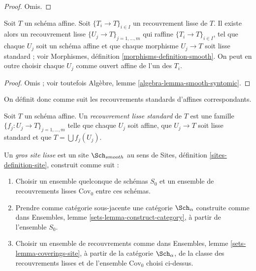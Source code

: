 \begin{proof}
Omis.
\end{proof}

\begin{lemma}
\label{lemma-smooth-affine}
Soit $T$ un schéma affine.
Soit $\{T_i \to T\}_{i \in I}$ un recouvrement lisse de $T$.
Il existe alors un recouvrement lisse
$\{U_j \to T\}_{j = 1, \ldots, m}$ qui raffine
$\{T_i \to T\}_{i \in I}$, tel que chaque $U_j$ soit un schéma
affine et que chaque morphisme $U_j \to T$ soit lisse
standard ; voir Morphismes, définition \ref{morphisms-definition-smooth}.
On peut en outre choisir chaque $U_j$ comme ouvert affine de l'un des $T_i$.
\end{lemma}

\begin{proof}
Omis ; voir toutefois Algèbre, lemme \ref{algebra-lemma-smooth-syntomic}.
\end{proof}

\noindent
On définit donc comme suit les recouvrements standards d'affines correspondants.

\begin{definition}
\label{definition-standard-smooth}
Soit $T$ un schéma affine. Un {\it recouvrement lisse standard}
de $T$ est une famille $\{f_j : U_j \to T\}_{j = 1, \ldots, m}$
telle que chaque $U_j$ soit affine, que $U_j \to T$ soit lisse standard
et que $T = \bigcup f_j(U_j)$.
\end{definition}

\begin{definition}
\label{definition-big-smooth-site}
Un {\it gros site lisse} est un site $\Sch_{smooth}$ au sens de
Sites, définition \ref{sites-definition-site}, construit comme suit :
\begin{enumerate}
\item Choisir un ensemble quelconque de schémas $S_0$ et un ensemble de recouvrements lisses
$\text{Cov}_0$ entre ces schémas.
\item Prendre comme catégorie sous-jacente une catégorie $\Sch_\alpha$
construite comme dans Ensembles, lemme \ref{sets-lemma-construct-category},
à partir de l'ensemble $S_0$.
\item Choisir un ensemble de recouvrements comme dans
Ensembles, lemme \ref{sets-lemma-coverings-site}, à partir de la
catégorie $\Sch_\alpha$, de la classe des recouvrements lisses
et de l'ensemble $\text{Cov}_0$ choisi ci-dessus.
\end{enumerate}
\end{definition}

